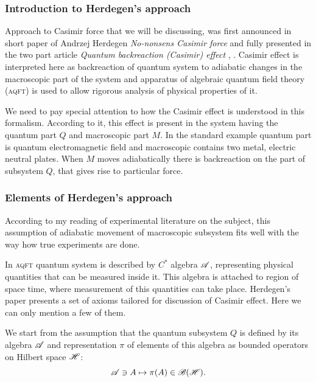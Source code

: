 \documentclass[10pt,t]{beamer}
\begin{document}
\begin{frame}
  \frametitle{Introduction to Herdegen's approach}


  Approach to Casimir force that we will be discussing, was first announced
  in short paper of Andrzej Herdegen \textit{No-nonsens Casimir force}
  \parencite{Herdegen-Nononsens-Casimir-force-Pub-2001} and fully presented
  in the two part article \textit{Quantum backreaction (Casimir) effect}
  \parencite{Herdegen-Quantum-backreaction-ETC-Part-I-Pub-2005},
  \parencite{Herdegen-Quantum-backreaction-ETC-Part-II-Pub-2006}. Casimir
  effect is interpreted here as backreaction of quantum system
  to adiabatic changes in the macroscopic part of the system and apparatus
  of algebraic quantum field theory (\textsc{aqft}) is used to allow
  rigorous analysis of physical properties of it.

  We need to pay special attention to how the Casimir effect is understood
  in this formalism. According to it, this effect is present in the system
  having the quantum part $Q$ and macroscopic part $M$. In the standard
  example quantum part is quantum electromagnetic field and macroscopic
  contains two metal, electric neutral plates. When $M$ moves
  \alert{adiabatically} there is backreaction on the part of subsystem $Q$,
  that gives rise to particular force.

\end{frame}





\begin{frame}
  \frametitle{Elements of Herdegen's approach}


  According to my reading of experimental literature on the subject,
  this assumption of adiabatic movement of macroscopic subsystem fits
  well with the way how true experiments are done.

  In \textsc{aqft} quantum system is described by $C^{ * }$ algebra
  $\mathcal{A}$, representing physical quantities that can be measured inside it.
  This algebra is attached to region of space time, where measurement of
  this quantities can take place. Herdegen's paper
  \parencite{Herdegen-Quantum-backreaction-ETC-Part-I-Pub-2005}
  presents a set of axioms tailored for discussion of Casimir effect.
  Here we can only mention a few of them.

  We start from the assumption that the quantum subsystem $Q$ is defined by
  its algebra $\mathcal{A}$ and representation $\pi$ of elements of this algebra as
  bounded operators on Hilbert space $\mathcal{H}$:
  \begin{equation}
    \label{eq:Overview-of-Herdegens-approach-ETC-01}
    \mathcal{A} \ni A \mapsto \pi( A ) \in \mathcal{B}( \mathcal{H} ).
  \end{equation}

\end{frame}
\end{document}
